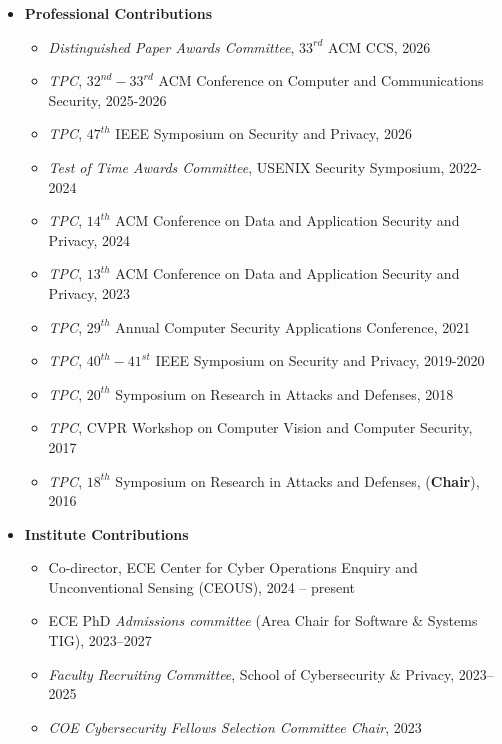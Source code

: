 \documentclass[11pt]{article}
\begin{document}
\begin{itemize}


\item {\bf Professional Contributions}

\begin{itemize}


\item {\it Distinguished Paper Awards Committee},  $33^{rd}$ ACM CCS, \hfill 2026

\item {\it TPC},  $32^{nd}-33^{rd}$ ACM Conference on Computer and Communications Security, \hfill 2025-2026

\item {\it TPC},  $47^{th}$ IEEE Symposium on Security and Privacy, \hfill 2026


\item {\it Test of Time Awards Committee}, USENIX Security Symposium, \hfill 2022-2024

\item {\it TPC},  $14^{th}$ ACM Conference on Data and Application Security and Privacy, \hfill 2024



\item {\it TPC},  $13^{th}$ ACM Conference on Data and Application Security and Privacy, \hfill 2023

\item {\it TPC},  $29^{th}$ Annual Computer Security Applications Conference, \hfill 2021

\item {\it TPC},  $40^{th}-41^{st}$ IEEE Symposium on Security and Privacy, \hfill 2019-2020


\item {\it TPC},  $20^{th}$ Symposium on Research in Attacks and Defenses, \hfill 2018

\item {\it TPC},  CVPR Workshop on Computer Vision and Computer Security, \hfill 2017

\item {\it TPC},  $18^{th}$ Symposium on Research in Attacks and Defenses, ({\bf Chair}), \hfill 2016

\end{itemize}

\item {\bf Institute Contributions}
\begin{itemize}
\item Co-director,  ECE Center for Cyber Operations Enquiry and \\ Unconventional Sensing (CEOUS), \hfill 2024 -- present
\item ECE PhD {\it Admissions committee} ({Area Chair} for Software \& Systems TIG), \hfill 2023--2027
\item {\it Faculty Recruiting Committee}, School of Cybersecurity \& Privacy, \hfill 2023--2025
\item {\it COE Cybersecurity Fellows Selection Committee Chair}, \hfill 2023



\end{itemize}
\end{itemize}
\end{document}
